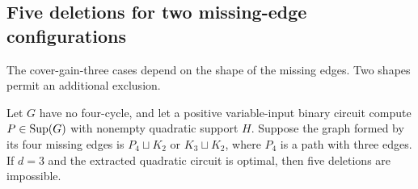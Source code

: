 \subsection{Five deletions for two missing-edge configurations}
The cover-gain-three cases depend on the shape of the missing edges. Two shapes permit an additional exclusion.

\begin{proposition}\label{prop:pathfive}
Let $G$ have no four-cycle, and let a positive variable-input binary circuit compute $P\in\operatorname{Sup}(G)$ with nonempty quadratic support $H$. Suppose the graph formed by its four missing edges is $P_4\sqcup K_2$ or $K_3\sqcup K_2$, where $P_4$ is a path with three edges. If $d=3$ and the extracted quadratic circuit is optimal, then five deletions are impossible.
\end{proposition}
